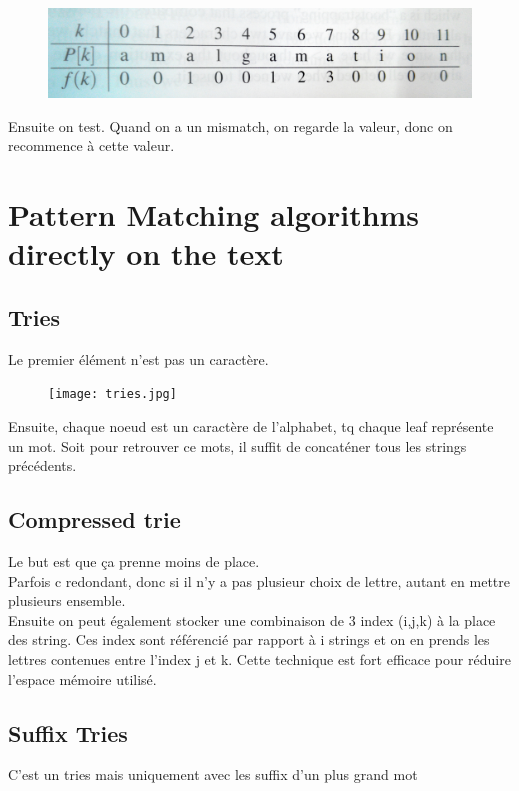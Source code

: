 \documentclass[a4paper]{article}
\begin{document}
\begin{figure}[!h]
\begin{center}
\includegraphics[scale=0.07]{KMP.jpg}
\end{center}
\end{figure}
Ensuite on test. Quand on a un mismatch, on regarde la valeur, donc on recommence à cette valeur.

\section{Pattern Matching algorithms directly on the text}

\subsection{Tries}
Le premier élément n'est pas un caractère.
\begin{figure}[!h]
\begin{center}
\texttt{[image: tries.jpg]}
\end{center}
\end{figure}
Ensuite, chaque noeud est un caractère de l'alphabet, tq chaque leaf représente un mot. Soit pour retrouver ce mots, il suffit de concaténer tous les strings précédents.


\subsection{Compressed trie}
Le but est que ça prenne moins de place.\\
Parfois c redondant, donc si il n'y a pas plusieur choix de lettre, autant en mettre plusieurs ensemble.\\
Ensuite on peut également stocker une combinaison de 3 index (i,j,k) à la place des string. Ces index sont référencié par rapport à i strings et on en prends les lettres contenues entre l'index j et k.
Cette technique est fort efficace pour réduire l'espace mémoire utilisé.

\subsection{Suffix Tries}
C'est un tries mais uniquement avec les suffix d'un plus grand mot
\end{document}

